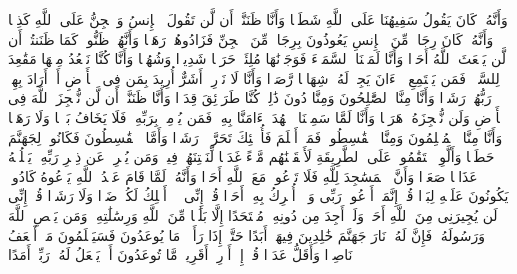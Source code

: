 \startbuffer[\q:72:4]
وَأَنَّهُۥ كَانَ یَقُولُ سَفِیهُنَا عَلَى ٱللَّهِ شَطَطࣰا%
\stopbuffer%
\startbuffer[\q:72:5]
وَأَنَّا ظَنَنَّاۤ أَن لَّن تَقُولَ ٱلۡإِنسُ وَٱلۡجِنُّ عَلَى ٱللَّهِ كَذِبࣰا%
\stopbuffer%
\startbuffer[\q:72:6]
وَأَنَّهُۥ كَانَ رِجَالࣱ مِّنَ ٱلۡإِنسِ یَعُوذُونَ بِرِجَالࣲ مِّنَ ٱلۡجِنِّ فَزَادُوهُمۡ رَهَقࣰا%
\stopbuffer%
\startbuffer[\q:72:7]
وَأَنَّهُمۡ ظَنُّوا۟ كَمَا ظَنَنتُمۡ أَن لَّن یَبۡعَثَ ٱللَّهُ أَحَدࣰا%
\stopbuffer%
\startbuffer[\q:72:8]
وَأَنَّا لَمَسۡنَا ٱلسَّمَاۤءَ فَوَجَدۡنَٰهَا مُلِئَتۡ حَرَسࣰا شَدِیدࣰا وَشُهُبࣰا%
\stopbuffer%
\startbuffer[\q:72:9]
وَأَنَّا كُنَّا نَقۡعُدُ مِنۡهَا مَقَٰعِدَ لِلسَّمۡعِۖ فَمَن یَسۡتَمِعِ ٱلۡءَانَ یَجِدۡ لَهُۥ شِهَابࣰا رَّصَدࣰا%
\stopbuffer%
\startbuffer[\q:72:10]
وَأَنَّا لَا نَدۡرِیۤ أَشَرٌّ أُرِیدَ بِمَن فِی ٱلۡأَرۡضِ أَمۡ أَرَادَ بِهِمۡ رَبُّهُمۡ رَشَدࣰا%
\stopbuffer%
\startbuffer[\q:72:11]
وَأَنَّا مِنَّا ٱلصَّٰلِحُونَ وَمِنَّا دُونَ ذَٰلِكَۖ كُنَّا طَرَاۤئِقَ قِدَدࣰا%
\stopbuffer%
\startbuffer[\q:72:12]
وَأَنَّا ظَنَنَّاۤ أَن لَّن نُّعۡجِزَ ٱللَّهَ فِی ٱلۡأَرۡضِ وَلَن نُّعۡجِزَهُۥ هَرَبࣰا%
\stopbuffer%
\startbuffer[\q:72:13]
وَأَنَّا لَمَّا سَمِعۡنَا ٱلۡهُدَىٰۤ ءَامَنَّا بِهِۦۖ فَمَن یُؤۡمِنۢ بِرَبِّهِۦ فَلَا یَخَافُ بَخۡسࣰا وَلَا رَهَقࣰا%
\stopbuffer%
\startbuffer[\q:72:14]
وَأَنَّا مِنَّا ٱلۡمُسۡلِمُونَ وَمِنَّا ٱلۡقَٰسِطُونَۖ فَمَنۡ أَسۡلَمَ فَأُو۟لَٰۤئِكَ تَحَرَّوۡا۟ رَشَدࣰا%
\stopbuffer%
\startbuffer[\q:72:15]
وَأَمَّا ٱلۡقَٰسِطُونَ فَكَانُوا۟ لِجَهَنَّمَ حَطَبࣰا%
\stopbuffer%
\startbuffer[\q:72:16]
وَأَلَّوِ ٱسۡتَقَٰمُوا۟ عَلَى ٱلطَّرِیقَةِ لَأَسۡقَیۡنَٰهُم مَّاۤءً غَدَقࣰا%
\stopbuffer%
\startbuffer[\q:72:17]
لِّنَفۡتِنَهُمۡ فِیهِۚ وَمَن یُعۡرِضۡ عَن ذِكۡرِ رَبِّهِۦ یَسۡلُكۡهُ عَذَابࣰا صَعَدࣰا%
\stopbuffer%
\startbuffer[\q:72:18]
وَأَنَّ ٱلۡمَسَٰجِدَ لِلَّهِ فَلَا تَدۡعُوا۟ مَعَ ٱللَّهِ أَحَدࣰا%
\stopbuffer%
\startbuffer[\q:72:19]
وَأَنَّهُۥ لَمَّا قَامَ عَبۡدُ ٱللَّهِ یَدۡعُوهُ كَادُوا۟ یَكُونُونَ عَلَیۡهِ لِبَدࣰا%
\stopbuffer%
\startbuffer[\q:72:20]
قُلۡ إِنَّمَاۤ أَدۡعُوا۟ رَبِّی وَلَاۤ أُشۡرِكُ بِهِۦۤ أَحَدࣰا%
\stopbuffer%
\startbuffer[\q:72:21]
قُلۡ إِنِّی لَاۤ أَمۡلِكُ لَكُمۡ ضَرࣰّا وَلَا رَشَدࣰا%
\stopbuffer%
\startbuffer[\q:72:22]
قُلۡ إِنِّی لَن یُجِیرَنِی مِنَ ٱللَّهِ أَحَدࣱ وَلَنۡ أَجِدَ مِن دُونِهِۦ مُلۡتَحَدًا%
\stopbuffer%
\startbuffer[\q:72:23]
إِلَّا بَلَٰغࣰا مِّنَ ٱللَّهِ وَرِسَٰلَٰتِهِۦۚ وَمَن یَعۡصِ ٱللَّهَ وَرَسُولَهُۥ فَإِنَّ لَهُۥ نَارَ جَهَنَّمَ خَٰلِدِینَ فِیهَاۤ أَبَدًا%
\stopbuffer%
\startbuffer[\q:72:24]
حَتَّىٰۤ إِذَا رَأَوۡا۟ مَا یُوعَدُونَ فَسَیَعۡلَمُونَ مَنۡ أَضۡعَفُ نَاصِرࣰا وَأَقَلُّ عَدَدࣰا%
\stopbuffer%
\startbuffer[\q:72:25]
قُلۡ إِنۡ أَدۡرِیۤ أَقَرِیبࣱ مَّا تُوعَدُونَ أَمۡ یَجۡعَلُ لَهُۥ رَبِّیۤ أَمَدًا%
